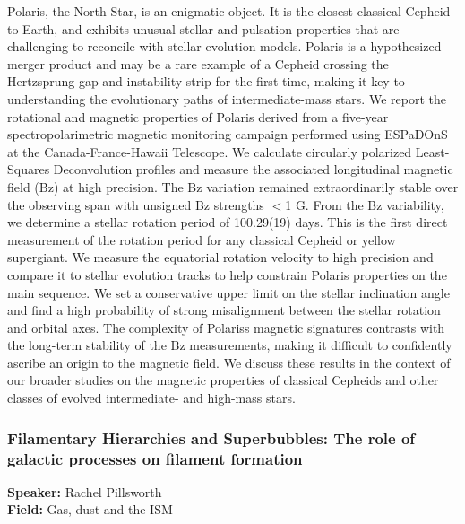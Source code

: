 Polaris, the North Star, is an enigmatic object. It is the closest classical Cepheid to Earth, and exhibits unusual stellar and pulsation properties that are challenging to reconcile with stellar evolution models. Polaris is a hypothesized merger product and may be a rare example of a Cepheid crossing the Hertzsprung gap and instability strip for the first time, making it key to understanding the evolutionary paths of intermediate-mass stars. We report the rotational and magnetic properties of Polaris derived from a five-year spectropolarimetric magnetic monitoring campaign performed using ESPaDOnS at the Canada-France-Hawaii Telescope. We calculate circularly polarized Least-Squares Deconvolution profiles and measure the associated longitudinal magnetic field (Bz) at high precision. The Bz variation remained extraordinarily stable over the observing span with unsigned Bz strengths $<$1 G. From the Bz variability, we determine a stellar rotation period of 100.29(19) days. This is the first direct measurement of the rotation period for any classical Cepheid or yellow supergiant. We measure the equatorial rotation velocity to high precision and compare it to stellar evolution tracks to help constrain Polaris properties on the main sequence. We set a conservative upper limit on the stellar inclination angle and find a high probability of strong misalignment between the stellar rotation and orbital axes. The complexity of Polariss magnetic signatures contrasts with the long-term stability of the Bz measurements, making it difficult to confidently ascribe an origin to the magnetic field. We discuss these results in the context of our broader studies on the magnetic properties of classical Cepheids and other classes of evolved intermediate- and high-mass stars.

\hypertarget{abstract-talk-6}{}\label{abstract-page-talk-6}
\subsubsection*{Filamentary Hierarchies and Superbubbles: The role of galactic processes on filament formation}
\textbf{Speaker:} Rachel Pillsworth\\
\textbf{Field:} Gas, dust and the ISM

